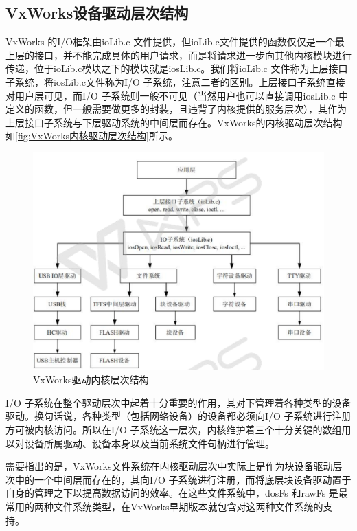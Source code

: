 \subsection{VxWorks设备驱动层次结构}
	VxWorks 的I/O框架由ioLib.c 文件提供，但ioLib.c文件提供的函数仅仅是一个最上层的接口，并不能完成具体的用户请求，而是将请求进一步向其他内核模块进行传递，位于ioLib.c模块之下的模块就是iosLib.c。我们将ioLib.c 文件称为上层接口子系统，将iosLib.c文件称为I/O 子系统，注意二者的区别。上层接口子系统直接对用户层可见，而I/O 子系统则一般不可见（当然用户也可以直接调用iosLib.c 中定义的函数，但一般需要做更多的封装，且违背了内核提供的服务层次），其作为上层接口子系统与下层驱动系统的中间层而存在。VxWorks的内核驱动层次结构如\autoref{fig:VxWorks内核驱动层次结构}所示。
\begin{figure}[!h]
\centering
\includegraphics[width=1.0\textwidth]{./graphics/vxworks-kernel-diagram.pdf}
\caption{VxWorks驱动内核层次结构}\label{fig:VxWorks内核驱动层次结构}
\end{figure}

	

	I/O 子系统在整个驱动层次中起着十分重要的作用，其对下管理着各种类型的设备驱动。换句话说，各种类型（包括网络设备）的设备都必须向I/O 子系统进行注册方可被内核访问。所以在I/O 子系统这一层次，内核维护着三个十分关键的数组用以对设备所属驱动、设备本身以及当前系统文件句柄进行管理。

	需要指出的是，VxWorks文件系统在内核驱动层次中实际上是作为块设备驱动层次中的一个中间层而存在的，其向I/O 子系统进行注册，而将底层块设备驱动置于自身的管理之下以提高数据访问的效率。在这些文件系统中，dosFs 和rawFs 是最常用的两种文件系统类型，在VxWorks早期版本就包含对这两种文件系统的支持。
	
